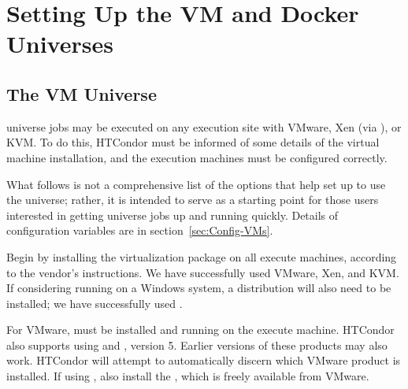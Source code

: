 \section{\label{sec:vm-install}Setting Up the VM and Docker Universes}

\subsection{\label{sec:vm-universe}The VM Universe}

 universe jobs may
be executed on any execution site with VMware, Xen
(via ), or KVM.
To do this, HTCondor must be informed of some details of the 
virtual machine installation, and the execution machines must
be configured correctly.

What follows is not a comprehensive list of the options that
help set up to use the  universe; rather,
it is intended to serve as a starting point for those users interested in
getting  universe jobs up and running quickly.
Details of configuration variables are in section~\ref{sec:Config-VMs}.

Begin by installing the virtualization package on all execute machines,
according to the vendor's instructions.
We have successfully used VMware, Xen, and KVM.
If considering running on a Windows system, 
a  distribution will also need to be installed;
we have successfully used . 

For VMware,  must be installed
and running on the execute machine.
HTCondor also
supports using  and , version 5.
Earlier versions of these products may also work.  
HTCondor will attempt to automatically discern which 
VMware product is installed.
If using , also install the ,
which is freely available from VMware.

